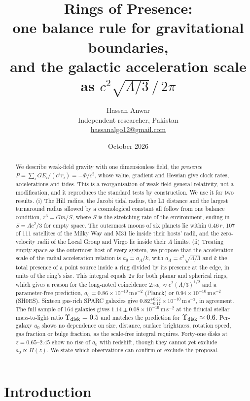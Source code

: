 \documentclass[11pt]{article}
\title{\Large\textbf{Rings of Presence:\\ one balance rule for gravitational boundaries,\\ and the galactic acceleration scale as $c^2\sqrt{\Lambda/3}\,/\,2\pi$}}
\author{Hassan Anwar\\[2pt]
\small Independent researcher, Pakistan\\
\small \href{mailto:hassanalgo12@gmail.com}{hassanalgo12@gmail.com}}
\date{October 2026}
\newcommand{\aL}{a_\Lambda}
\newcommand{\unit}[1]{\,\mathrm{#1}}
\newcommand{\aunit}{\times10^{-10}\unit{m\,s^{-2}}}
\begin{document}
\maketitle

\begin{abstract}
\noindent
We describe weak-field gravity with one dimensionless field, the \emph{presence} $P=\sum_i G E_i/(c^4 r_i)=-\Phi/c^2$, whose value, gradient and Hessian give clock rates, accelerations and tides. This is a reorganisation of weak-field general relativity, not a modification, and it reproduces the standard tests by construction. We use it for two results.
(i) The Hill radius, the Jacobi tidal radius, the L1 distance and the largest turnaround radius allowed by a cosmological constant all follow from one balance condition, $r^3=Gm/S$, where $S$ is the stretching rate of the environment, ending in $S=\Lambda c^2/3$ for empty space. The outermost moons of six planets lie within $0.46\,r$, 107 of 111 satellites of the Milky Way and M31 lie inside their hosts' radii, and the zero-velocity radii of the Local Group and Virgo lie inside their $\Lambda$ limits.
(ii) Treating empty space as the outermost host of every system, we propose that the acceleration scale of the radial acceleration relation is $a_0=\aL/k$, with $\aL=c^2\sqrt{\Lambda/3}$ and $k$ the total presence of a point source inside a ring divided by its presence at the edge, in units of the ring's size. This integral equals $2\pi$ for both planar and spherical rings, which gives a reason for the long-noted coincidence $2\pi a_0\approx c^2(\Lambda/3)^{1/2}$ and a parameter-free prediction, $a_0=0.86\aunit$ (Planck) or $0.94\aunit$ (SH0ES).
Sixteen gas-rich SPARC galaxies give $0.82^{+0.22}_{-0.17}\aunit$, in agreement. The full sample of 164 galaxies gives $1.14\pm0.08\aunit$ at the fiducial stellar mass-to-light ratio $\Upsilon_{\rm disk}=0.5$ and matches the prediction for $\Upsilon_{\rm disk}\approx0.6$. Per-galaxy $a_0$ shows no dependence on size, distance, surface brightness, rotation speed, gas fraction or bulge fraction, as the scale-free integral requires. Forty-one disks at $z=0.65$--$2.45$ show no rise of $a_0$ with redshift, though they cannot yet exclude $a_0\propto H(z)$. We state which observations can confirm or exclude the proposal.
\end{abstract}

\section{Introduction}
\end{document}
